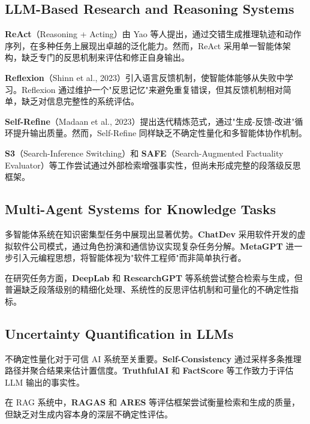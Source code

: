 \documentclass[12pt,a4paper]{article}
\begin{document}
\subsection{LLM-Based Research and Reasoning Systems}
\textbf{ReAct}（Reasoning + Acting）由 Yao 等人提出，通过交错生成推理轨迹和动作序列，在多种任务上展现出卓越的泛化能力。然而，ReAct 采用单一智能体架构，缺乏专门的反思机制来评估和修正自身输出。

\textbf{Reflexion}（Shinn et al., 2023）引入语言反馈机制，使智能体能够从失败中学习。Reflexion 通过维护一个"反思记忆"来避免重复错误，但其反馈机制相对简单，缺乏对信息完整性的系统评估。

\textbf{Self-Refine}（Madaan et al., 2023）提出迭代精炼范式，通过"生成-反馈-改进"循环提升输出质量。然而，Self-Refine 同样缺乏不确定性量化和多智能体协作机制。

\textbf{S3}（Search-Inference Switching）和 \textbf{SAFE}（Search-Augmented Factuality Evaluator）等工作尝试通过外部检索增强事实性，但尚未形成完整的段落级反思框架。

\subsection{Multi-Agent Systems for Knowledge Tasks}
多智能体系统在知识密集型任务中展现出显著优势。\textbf{ChatDev} 采用软件开发的虚拟软件公司模式，通过角色扮演和通信协议实现复杂任务分解。\textbf{MetaGPT} 进一步引入元编程思想，将智能体视为"软件工程师"而非简单执行者。

在研究任务方面，\textbf{DeepLab} 和 \textbf{ResearchGPT} 等系统尝试整合检索与生成，但普遍缺乏段落级别的精细化处理、系统性的反思评估机制和可量化的不确定性指标。

\subsection{Uncertainty Quantification in LLMs}
不确定性量化对于可信 AI 系统至关重要。\textbf{Self-Consistency} 通过采样多条推理路径并聚合结果来估计置信度。\textbf{TruthfulAI} 和 \textbf{FactScore} 等工作致力于评估 LLM 输出的事实性。

在 RAG 系统中，\textbf{RAGAS} 和 \textbf{ARES} 等评估框架尝试衡量检索和生成的质量，但缺乏对生成内容本身的深层不确定性评估。
\end{document}
